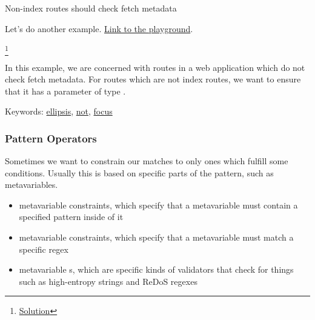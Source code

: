 \documentclass[aspectratio=169, handout]{beamer}
\newenvironment{exercisePage}[1]{
  \begin{minipage}[t][0.4in][t]{\textwidth}
    \Large \term{Exercise:} #1
  \end{minipage}
  \begin{minipage}[t][2.6in][t]{\textwidth}
}{
  \end{minipage}
}
\newcommand\blfootnote[1]{
    \begingroup
    \renewcommand\thefootnote{}\footnote{#1}
    \addtocounter{footnote}{-1}
    \endgroup
}
\newcommand\solutionLink[1]{
  \blfootnote{\color{blue}\href{#1}{Solution}}
}
\newcommand\ellipsisLink[1][]{{\color{blue}\href{https://semgrep.dev/docs/writing-rules/pattern-syntax\#ellipsis-operator}{ellipsis}}}
\newcommand\patternNotLink[1][]{{\color{blue}\href{https://semgrep.dev/docs/writing-rules/rule-syntax\#pattern-not}{not}}}
\newcommand\focusLink[1][]{{\color{blue}\href{https://semgrep.dev/docs/writing-rules/rule-syntax\#focus-metavariable}{focus}}}
\begin{document}
\begin{frame}[fragile]
  \begin{exercisePage}{Non-index routes should check fetch metadata}

  Let's do another example. {\color{blue}\href{https://semgrep.dev/playground/r/0oULYkB/semgrep.secfetch-metadata}{Link to the playground}}.
  \solutionLink{https://semgrep.dev/playground/r/KxUv69E/semgrep.secfetch-metadata-solution}

  \vspace{\fill}

  In this example, we are concerned with routes in a web application which do not
  check fetch metadata. For routes which are not index routes, we want to ensure
  that it has a parameter of type .

  \vspace{\fill}

  Keywords: \ellipsisLink, \patternNotLink, \focusLink
  \end{exercisePage}
\end{frame}

\begin{frame}[fragile]
  \frametitle{Pattern Operators}

  Sometimes we want to constrain our matches to only ones which fulfill some conditions.
  Usually this is based on specific parts of the pattern, such as metavariables.

  \vspace{\fill}

  \begin{itemize}
    \item metavariable  constraints, which specify that a metavariable
    must contain a specified pattern inside of it
    \item metavariable  constraints, which specify that a metavariable
    must match a specific regex
    \item metavariable s, which are specific kinds of validators
    that check for things such as high-entropy strings and ReDoS regexes
  \end{itemize}
\end{frame}
\end{document}
